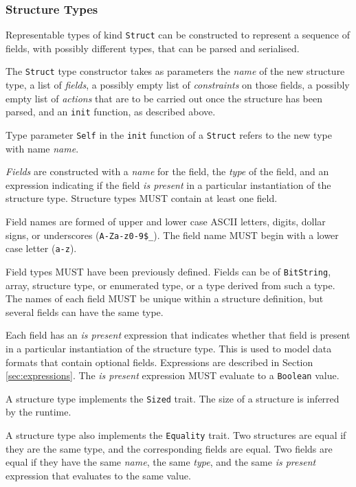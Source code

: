 \documentclass[10pt,twocolumn,a4paper]{article}
\newcommand{\code}[1]{\texttt{#1}}
\begin{document}
\subsubsection{Structure Types}

Representable types of kind \code{Struct} can be constructed to represent
a sequence of fields, with possibly different types, that can be parsed
and serialised.

The \code{Struct} type constructor takes as parameters the \emph{name} of
the new structure type, a list of \emph{fields}, a possibly empty list of
\emph{constraints} on those fields, a possibly empty list of
\emph{actions} that are to be carried out once the structure has been
parsed, and an \code{init} function, as described above.

Type parameter \code{Self} in the \code{init} function of a \code{Struct} refers
to the new type with name \emph{name}.

\emph{Fields} are constructed with a \emph{name} for the field, the
\emph{type} of the field, and an expression indicating if the field
\emph{is present} in a particular instantiation of the structure type.
Structure types MUST contain at least one field.

Field names are formed of upper and lower case ASCII letters,
digits, dollar signs, or underscores (\code{A-Za-z0-9\$\_}). The field name
MUST begin with a lower case letter (\code{a-z}).

Field types MUST have been previously defined.
Fields can be of \code{BitString}, array, structure type, or enumerated type,
or a type derived from such a type. The names of each field MUST be unique
within a structure definition, but several fields can have the same type.

Each field has an \emph{is present} expression that indicates
whether that field is present in a particular instantiation of the
structure type. This is used to model data formats that contain optional
fields. Expressions are described in Section \ref{sec:expressions}. The
\emph{is present} expression MUST evaluate to a \code{Boolean} value.

A structure type implements the \code{Sized} trait. The size of a structure is
inferred by the runtime.

A structure type also implements the \code{Equality} trait. Two structures
are equal if they are the same type, and the
corresponding fields are equal. Two fields are equal if they have the same
\emph{name}, the same \emph{type}, and the same \emph{is present} expression
that evaluates to the same value.
\end{document}
